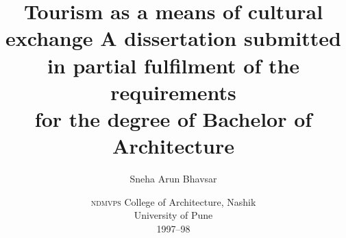 \documentclass[a5paper,10pt,twoside]{book}
\title{
  Tourism as a means of cultural exchange
  \newline
  \newline
  \small{
  A dissertation submitted in partial fulfilment of the requirements\\
  for the degree of Bachelor of Architecture
  }
}
\author{Sneha Arun Bhavsar}
\date{
    \small{
    \textsc{ndmvps} College of Architecture, Nashik\\
    University of Pune\\
    1997--98
  }
}
\begin{document}
  \maketitle

  \pagebreak

  

  \pagebreak

  \tableofcontents
  
  \listoffigures
  

  \vfill
  
  \pagebreak

    
  
  
  
  
\end{document}

